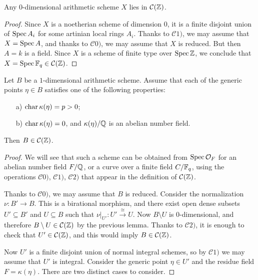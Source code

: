 \documentclass{article}
\numberwithin{equation}{section}
\begin{document}
\begin{lemma}
  Any $0$-dimensional arithmetic scheme $X$ lies in $\mathcal{C} (\mathbb{Z})$.

  \begin{proof}
    Since $X$ is a noetherian scheme of dimension $0$, it is a finite disjoint
    union of $\operatorname{Spec} A_i$ for some artinian local rings $A_i$. Thanks to
    $\mathcal{C}1)$, we may assume that $X = \operatorname{Spec} A$, and thanks to
    $\mathcal{C}0)$, we may assume that $X$ is reduced. But then $A = k$ is a
    field. Since $X$ is a scheme of finite type over $\operatorname{Spec} \mathbb{Z}$, we conclude
    that $X = \operatorname{Spec} \mathbb{F}_q \in \mathcal{C} (\mathbb{Z})$.
  \end{proof}
\end{lemma}

\begin{proposition}
  \label{prop:particular-cases-1-dim-base}
  Let $B$ be a $1$-dimensional arithmetic scheme. Assume that each of the
  generic points $\eta \in B$ satisfies one of the following properties:
  \begin{enumerate}
  \item[a)] $\operatorname{char} \kappa (\eta) = p > 0$;

  \item[b)] $\operatorname{char} \kappa (\eta) = 0$, and $\kappa (\eta)/\mathbb{Q}$ is an abelian
    number field.
  \end{enumerate}
  Then $B \in \mathcal{C} (\mathbb{Z})$.

  \begin{proof}
    We will see that such a scheme can be obtained from $\operatorname{Spec} \mathcal{O}_F$
    for an abelian number field $F/\mathbb{Q}$, or a curve over a finite field
    $C/\mathbb{F}_q$, using the operations $\mathcal{C}0)$, $\mathcal{C}1)$,
    $\mathcal{C}2)$ that appear in the definition of $\mathcal{C} (\mathbb{Z})$.

    Thanks to $\mathcal{C}0)$, we may assume that $B$ is reduced. Consider the
    normalization $\nu\colon B' \to B$. This is a birational morphism, and there
    exist open dense subsets $U' \subseteq B'$ and $U \subseteq B$ such that
    $\left.\nu\right|_{U'}\colon U' \xrightarrow{\cong} U$. Now $B\setminus U$
    is $0$-dimensional, and therefore $B\setminus U \in \mathcal{C} (\mathbb{Z})$ by
    the previous lemma. Thanks to $\mathcal{C}2)$, it is enough to check that
    $U' \in \mathcal{C} (\mathbb{Z})$, and this would imply $B \in \mathcal{C} (\mathbb{Z})$.

    Now $U'$ is a finite disjoint union of normal integral schemes, so by
    $\mathcal{C}1)$ we may assume that $U'$ is integral. Consider the generic
    point $\eta \in U'$ and the residue field $F = \kappa (\eta)$. There are two
    distinct cases to consider.


\end{proof}
\end{proposition}
\end{document}
